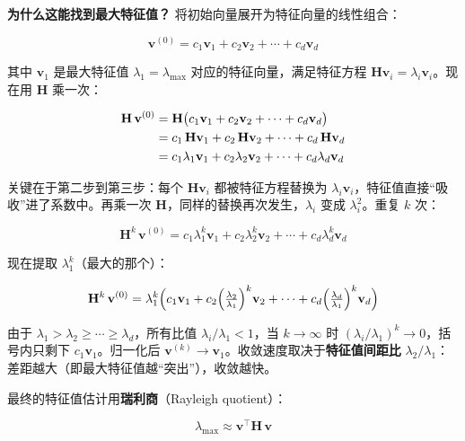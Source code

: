 \documentclass[11pt,a4paper]{ctexart}
\newcommand{\lmax}{\lambda_{\max}}
\newcommand{\Hmat}{\mathbf{H}}
\begin{document}
\textbf{为什么这能找到最大特征值？} 将初始向量展开为特征向量的线性组合：

\begin{equation}
  \mathbf{v}^{(0)} = c_1\mathbf{v}_1 + c_2\mathbf{v}_2 + \cdots + c_d\mathbf{v}_d
\end{equation}

其中 $\mathbf{v}_1$ 是最大特征值 $\lambda_1=\lmax$ 对应的特征向量，满足特征方程 $\Hmat\mathbf{v}_i = \lambda_i\mathbf{v}_i$。现在用 $\Hmat$ 乘一次：

\begin{align}
  \Hmat\,\mathbf{v}^{(0)} &= \Hmat\bigl(c_1\mathbf{v}_1 + c_2\mathbf{v}_2 + \cdots + c_d\mathbf{v}_d\bigr) \notag\\
  &= c_1\,\Hmat\mathbf{v}_1 + c_2\,\Hmat\mathbf{v}_2 + \cdots + c_d\,\Hmat\mathbf{v}_d \notag\\
  &= c_1\lambda_1\mathbf{v}_1 + c_2\lambda_2\mathbf{v}_2 + \cdots + c_d\lambda_d\mathbf{v}_d
\end{align}

关键在于第二步到第三步：每个 $\Hmat\mathbf{v}_i$ 都被特征方程替换为 $\lambda_i\mathbf{v}_i$，特征值直接``吸收''进了系数中。再乘一次 $\Hmat$，同样的替换再次发生，$\lambda_i$ 变成 $\lambda_i^2$。重复 $k$ 次：

\begin{equation}
  \Hmat^k\,\mathbf{v}^{(0)} = c_1\lambda_1^k\mathbf{v}_1 + c_2\lambda_2^k\mathbf{v}_2 + \cdots + c_d\lambda_d^k\mathbf{v}_d
\end{equation}

现在提取 $\lambda_1^k$（最大的那个）：

\begin{equation}
  \Hmat^k\,\mathbf{v}^{(0)} = \lambda_1^k\Bigl(c_1\mathbf{v}_1 + c_2\Bigl(\tfrac{\lambda_2}{\lambda_1}\Bigr)^k\mathbf{v}_2 + \cdots + c_d\Bigl(\tfrac{\lambda_d}{\lambda_1}\Bigr)^k\mathbf{v}_d\Bigr)
\end{equation}

由于 $\lambda_1 > \lambda_2 \geq \cdots \geq \lambda_d$，所有比值 $\lambda_i/\lambda_1 < 1$，当 $k\to\infty$ 时 $(\lambda_i/\lambda_1)^k \to 0$，括号内只剩下 $c_1\mathbf{v}_1$。归一化后 $\mathbf{v}^{(k)} \to \mathbf{v}_1$。收敛速度取决于\textbf{特征值间距比} $\lambda_2/\lambda_1$：差距越大（即最大特征值越``突出''），收敛越快。

最终的特征值估计用\textbf{瑞利商}（Rayleigh quotient）：

\begin{equation}\label{eq:rayleigh}
  \lmax \approx \mathbf{v}^\top \Hmat\, \mathbf{v}
\end{equation}
\end{document}
